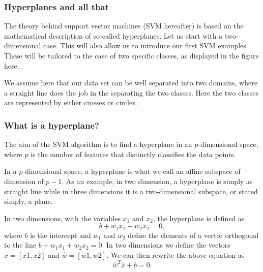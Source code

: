 \documentclass{beamer}
\begin{document}
\begin{frame}
\frametitle{Hyperplanes and all that}

The theory behind support vector machines (SVM hereafter) is based on
the mathematical description of so-called hyperplanes. Let us start
with a two-dimensional case. This will also allow us to introduce our
first SVM examples. These will be tailored to the case of two specific
classes, as displayed in the figure here.

We assume here that our data set can be well separated into two
domains, where a straight line does the job in the separating the two
classes. Here the two classes are represented by either crosses or
circles.
\end{frame}

\begin{frame}
\frametitle{What is a hyperplane?}

The aim of the SVM algorithm is to find a hyperplane in an $p$-dimensional space, where $p$ is the number of features  that distinctly classifies the data points.  

In a $p$-dimensional space, a hyperplane is what we call an affine subspace of dimension of $p-1$.
As an example, in two dimension, a hyperplane is simply as straight line while in three dimensions it is 
a two-dimensional subspace, or stated simply, a plane. 

In two dimensions, with the variables $x_1$ and $x_2$, the hyperplane is defined as
\[
b+w_1x_1+w_2x_2=0,
\]
where $b$ is the intercept and $w_1$ and $w_2$ define the elements of a vector orthogonal to the line 
$b+w_1x_1+w_2x_2=0$. 
In two dimensions we define the vectors $\hat{x} =[x1,x2]$ and $\hat{w}=[w1,w2]$. 
We can then rewrite the above equation as 
\[
\hat{w}^T\hat{x}+b=0.
\]
\end{frame}
\end{document}
